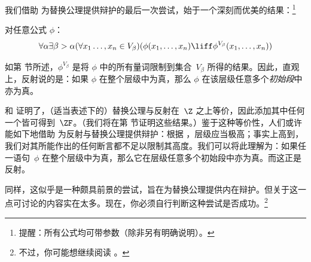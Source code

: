 \documentclass[../../../include/open-logic-section]{subfiles}
\begin{document}

我们借助 \stagesinex{} 为替换公理提供辩护的最后一次尝试，始于一个深刻而优美的结果：\footnote{提醒：所有公式均可带参数（除非另有明确说明）。}


\begin{thm}[反射模式]
对任意公式 $\phi$：
\[
\forall \alpha \exists \beta > \alpha (\forall x_1 \ldots, x_n \in
V_\beta)(\phi(x_1, \ldots, x_n) \liff \phi^{V_\beta}(x_1, \ldots, x_n))
\]
\end{thm}


\noindent
如第  节所述，$\phi^{V_\beta}$ 是将 $\phi$ 中的所有量词限制到集合~$V_\beta$ 所得的结果。因此，直观上，反射说的是：如果 $\phi$ 在整个层级中为真，那么 $\phi$ 在该层级任意多个\emph{初始段}中亦为真。

\citet{Montague1961} 和 \citet{Levy1960} 证明了，（适当表述下的）替换公理与反射在~$\Z$ 之上等价，因此添加其中任何一个皆可得到~$\ZF$。（我们将在第  节证明这些结果。）鉴于这种等价性，人们或许能如下地借助 \stagesinex{} 为反射与替换公理提供辩护：根据 \stagesinex{}，层级应当极高；事实上高到，我们对其所能作出的任何断言都不足以限制其高度。我们可以将此理解为：如果任一语句~$\phi$ 在整个层级中为真，那么它在层级任意多个初始段中亦为真。而这正是反射。

同样，这似乎是一种颇具前景的尝试，旨在为替换公理提供内在辩护。但关于这一点可讨论的内容实在太多。现在，你必须自行判断这种尝试是否成功。\footnote{不过，你可能想继续阅读 \citet[95--100]{Incurvati2020}。}
\end{document}

